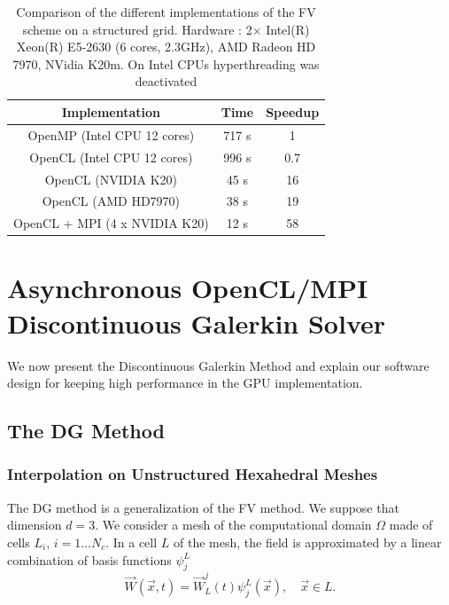 \documentclass{svmult}
\begin{document}
\begin{table}
  \centering
  \caption{Comparison of the different implementations of the FV scheme
    on a structured grid. Hardware : 2$\times$ Intel(R) Xeon(R) E5-2630
    (6 cores, 2.3GHz), AMD Radeon HD 7970, NVidia K20m. On Intel CPUs
    hyperthreading was deactivated \label{fv-speedup}}
  \begin{tabular}{|c|c|c|}
    \hline
    Implementation & Time & Speedup\tabularnewline
    \hline
    \hline
    OpenMP (Intel CPU 12 cores) & 717 s & 1\tabularnewline
    \hline
    OpenCL (Intel CPU 12 cores) & 996 s & 0.7\tabularnewline
    \hline
    OpenCL (NVIDIA K20) & 45 s & 16\tabularnewline
    \hline
    OpenCL (AMD HD7970) & 38 s & 19\tabularnewline
    \hline
    OpenCL + MPI (4 x NVIDIA K20) & 12 s & 58\tabularnewline
    \hline
  \end{tabular}

\end{table}


\section{\label{async}Asynchronous OpenCL/MPI Discontinuous Galerkin Solver}

We now present the Discontinuous Galerkin Method and explain our
software design for keeping high performance in the GPU
implementation.
\subsection{The DG Method}

\subsubsection{Interpolation on Unstructured Hexahedral Meshes}
The DG method is a generalization of the FV method. We suppose that
dimension $d=3$.  We consider a mesh of the computational domain
$\Omega$ made of cells $L_i$, $i=1\ldots N_c$.  In a cell $L$ of the
mesh, the field is approximated by a linear combination of basis
functions $\psi_j^L$
\begin{equation}\label{eq:expansion}
  \vec{W}(\vec{x},t)=\vec{W}_{L}^{j}(t)\psi_{j}^{L}(\vec{x}),\quad \vec{x}\in L.
\end{equation}
\end{document}

